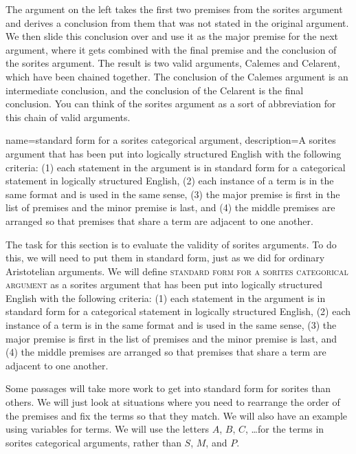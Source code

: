 The argument on the left takes the first two premises from the sorites argument and derives a conclusion from them that was not stated in the original argument. We then slide this conclusion over and use it as the major premise for the next argument, where it gets combined with the final premise and the conclusion of the sorites argument. The result is two valid arguments, Calemes and Celarent, which have been chained together. The conclusion of the Calemes argument is an intermediate conclusion, and the conclusion of the Celarent is the final conclusion. You can think of the sorites argument as a sort of abbreviation for this chain of valid arguments.

{
name=standard form for a sorites categorical argument,
description={A sorites argument that has been put into logically structured English with the following criteria: (1) each statement in the argument is in standard form for a categorical statement in logically structured English, (2) each instance of a term is in the same format and is used in the same sense, (3) the major premise is first in the list of premises and the minor premise is last, and (4) the middle premises are arranged so that premises that share a term are adjacent to one another.}
}

The task for this section is to evaluate the validity of sorites arguments. To do this, we will need to put them in standard form, just as we did for ordinary Aristotelian arguments. We will define \textsc{\gls{standard form for a sorites categorical argument}} \label{def:standard_form_for_a_sorites_categorical_argument} as a sorites argument that has been put into logically structured English with the following criteria: (1) each statement in the argument is in standard form for a categorical statement in logically structured English, (2) each instance of a term is in the same format and is used in the same sense, (3) the major premise is first in the list of premises and the minor premise is last, and (4) the middle premises are arranged so that premises that share a term are adjacent to one another.

Some passages will take more work to get into standard form for sorites than others. We will just look at situations where you need to rearrange the order of the premises and fix the terms so that they match. We will also have an example using variables for terms. We will use the letters $A$, $B$, $C$, \ldots for the terms in sorites categorical arguments, rather than $S$, $M$, and $P$.


